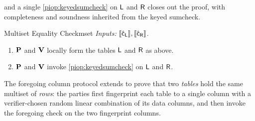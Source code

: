 \fi
and a single \cref{piop:keyedsumcheck} on $\mathsf{L}$ and $\mathsf{R}$ closes out the proof, with completeness and soundness inherited from the keyed sumcheck.
\begin{DefinePIOP}{Multiset Equality Check}{mset}
  \emph{Inputs:} $\llbracket\hat{\mathsf{c}}_{\mathsf{L}}\rrbracket, \llbracket\hat{\mathsf{c}}_{\mathsf{R}}\rrbracket$.
  \begin{enumerate}[nosep]
    \item $\bf{P}$ and $\bf{V}$ locally form the tables $\mathsf{L}$ and $\mathsf{R}$ as above.
    \item $\bf{P}$ and $\bf{V}$ invoke \cref{piop:keyedsumcheck} on $\mathsf{L}$ and $\mathsf{R}$.
  \end{enumerate}
\end{DefinePIOP}

 The foregoing column protocol extends to prove that two \emph{tables} hold the same multiset of \emph{rows}: the parties first fingerprint each table to a single column with a verifier-chosen random linear combination of its data columns, and then invoke the foregoing check on the two fingerprint columns.

